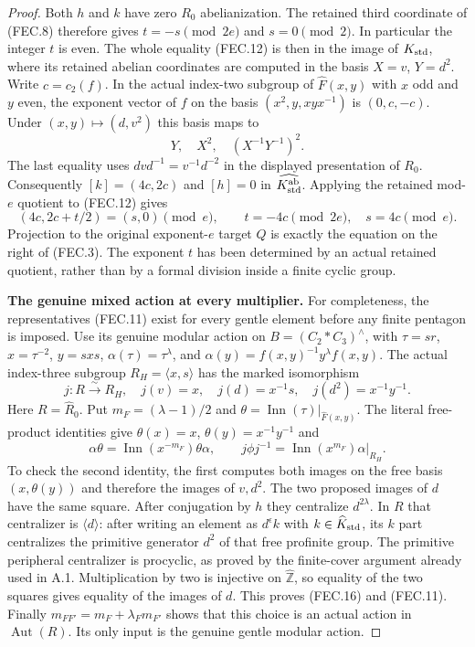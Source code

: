 \begin{proof}
Both $h$ and $k$ have zero $R_0$ abelianization.
The retained third coordinate of (FEC.8) therefore gives
$t=-s\pmod{2e}$ and $s=0\pmod2$.  In particular the
integer $t$ is even.  The whole equality (FEC.12) is
then in the image of $K_{\rm std}$, where its retained
abelian coordinates are computed in the basis
$X=v$, $Y=d^2$.
Write $c=c_2(f)$.  In the actual index-two subgroup of
$\widehat F(x,y)$ with $x$ odd and $y$ even, the exponent
vector of $f$ on the basis $(x^2,y,xyx^{-1})$ is
$(0,c,-c)$.  Under $(x,y)\mapsto(d,v^2)$ this basis
maps to
\[
                    Y,\quad X^2,\quad(X^{-1}Y^{-1})^2.
                                                               \tag{FEC.13}
\]
The last equality uses $dvd^{-1}=v^{-1}d^{-2}$ in
the displayed presentation of $R_0$.
Consequently $[k]=(4c,2c)$ and $[h]=0$ in
$\widehat{K_{\rm std}^{\rm ab}}$.  Applying the retained mod-$e$
quotient to (FEC.12) gives
\[
           (4c,2c+t/2)=(s,0)\pmod e,
 \qquad t=-4c\pmod{2e},\quad s=4c\pmod e.
                                                               \tag{FEC.14}
\]
Projection to the original exponent-$e$ target $Q$
is exactly the equation on the right of (FEC.3).
The exponent $t$ has been determined by an actual
retained quotient, rather than by a formal division
inside a finite cyclic group.

\par\medskip\noindent\textbf{The genuine mixed action at every multiplier.}\quad
For completeness, the representatives (FEC.11) exist
for every gentle element before any finite pentagon
is imposed.  Use its genuine modular action on
$B=(C_2*C_3)^{\wedge}$, with
$\tau=sr$, $x=\tau^{-2}$, $y=sxs$,
$\alpha(\tau)=\tau^\lambda$, and
$\alpha(y)=f(x,y)^{-1}y^\lambda f(x,y)$.
The actual index-three subgroup
$R_H=\langle x,s\rangle$ has the marked isomorphism
\[
 j:R\xrightarrow{\sim}R_H,
 \quad j(v)=x,\quad j(d)=x^{-1}s,
 \quad j(d^2)=x^{-1}y^{-1}.
                                                               \tag{FEC.15}
\]
Here $R=\widehat R_0$.
Put $m_F=(\lambda-1)/2$ and
$\theta=\operatorname{Inn}(\tau)|_{\widehat F(x,y)}$.
The literal free-product identities give
$\theta(x)=x$, $\theta(y)=x^{-1}y^{-1}$ and
\[
 \alpha\theta=\operatorname{Inn}(x^{-m_F})\theta\alpha,
 \qquad
 j\phi j^{-1}=\operatorname{Inn}(x^{m_F})\alpha|_{R_H}.
                                                               \tag{FEC.16}
\]
To check the second identity, the first computes both
images on the free basis $(x,\theta(y))$ and therefore
the images of $v,d^2$.  The two proposed images of $d$
have the same square.  After conjugation by $h$ they
centralize $d^{2\lambda}$.  In $R$ that centralizer is
$\langle d\rangle$: after writing an element as $d^\epsilon k$
with $k\in\widehat K_{\rm std}$, its $k$ part centralizes the
primitive generator $d^2$ of that free profinite group.
The primitive peripheral centralizer is procyclic, as
proved by the finite-cover argument already used in A.1.
Multiplication by two is injective on $\widehat{\mathbb Z}$,
so equality of the two squares gives equality of the
images of $d$.  This proves (FEC.16) and (FEC.11).
Finally $m_{FF'}=m_F+\lambda_Fm_{F'}$ shows that this
choice is an actual action in $\operatorname{Aut}(R)$.
Its only input is the genuine gentle modular action.


\end{proof}
